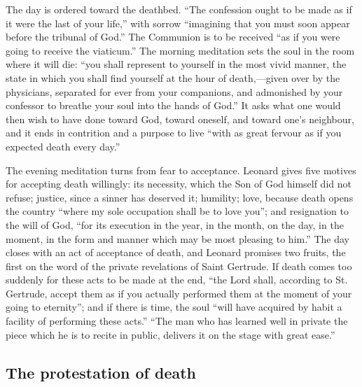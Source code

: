 The day is ordered toward the deathbed. ``The confession ought to be made as if it were the last of your life,'' with sorrow ``imagining that you must soon appear before the tribunal of God.'' The Communion is to be received ``as if you were going to receive the viaticum.'' The morning meditation sets the soul in the room where it will die: ``you shall represent to yourself in the most vivid manner, the state in which you shall find yourself at the hour of death,---given over by the physicians, separated for ever from your companions, and admonished by your confessor to breathe your soul into the hands of God.'' It asks what one would then wish to have done toward God, toward oneself, and toward one's neighbour, and it ends in contrition and a purpose to live ``with as great fervour as if you expected death every day.''

The evening meditation turns from fear to acceptance. Leonard gives five motives for accepting death willingly: its necessity, which the Son of God himself did not refuse; justice, since a sinner has deserved it; humility; love, because death opens the country ``where my sole occupation shall be to love you''; and resignation to the will of God, ``for its execution in the year, in the month, on the day, in the moment, in the form and manner which may be most pleasing to him.'' The day closes with an act of acceptance of death, and Leonard promises two fruits, the first on the word of the private revelations of Saint Gertrude. If death comes too suddenly for these acts to be made at the end, ``the Lord shall, according to St. Gertrude, accept them as if you actually performed them at the moment of your going to eternity''; and if there is time, the soul ``will have acquired by habit a facility of performing these acts.'' ``The man who has learned well in private the piece which he is to recite in public, delivers it on the stage with great ease.''

\subsection{The protestation of death}

